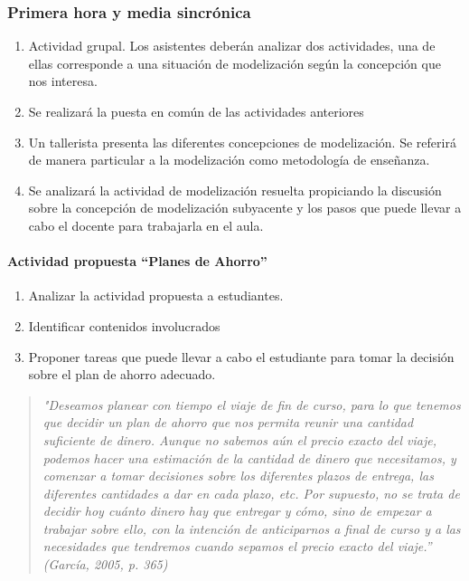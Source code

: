 \subsubsection{Primera hora y media sincrónica}

\begin{enumerate}
	\item Actividad grupal. Los asistentes deberán analizar dos actividades, una de ellas corresponde a una situación de modelización según la concepción que nos interesa.
	\item Se realizará la puesta en común de las actividades anteriores
	\item Un tallerista presenta las diferentes concepciones de modelización. Se referirá de manera particular a la modelización como metodología de enseñanza.
	\item Se analizará la actividad de modelización resuelta propiciando la discusión sobre la concepción de modelización subyacente y los pasos que puede llevar a cabo el docente para trabajarla en el aula.
\end{enumerate}

\begin{center}
	\begin{minipage}{0.7\linewidth}
		\paragraph*{Actividad propuesta “Planes de Ahorro”}
		
		\begin{enumerate}[{Consigna} 1:]
			\item Analizar la actividad propuesta a estudiantes.
			\item Identificar contenidos involucrados
			\item Proponer tareas que puede llevar a cabo el estudiante para tomar la decisión sobre el plan de ahorro adecuado.
		\end{enumerate}
	\end{minipage}
\end{center}

\bigskip

\begin{quote}
	\itshape
	"Deseamos planear con tiempo el viaje de fin de curso, para lo que tenemos que decidir un plan de ahorro que nos permita reunir una cantidad suficiente de dinero. Aunque no sabemos aún el precio exacto del viaje, podemos hacer una estimación de la cantidad de dinero que necesitamos, y comenzar a tomar decisiones sobre los diferentes plazos de entrega, las diferentes cantidades a dar en cada plazo, etc. Por supuesto, no se trata de decidir hoy cuánto dinero hay que entregar y cómo, sino de empezar a trabajar sobre ello, con la intención de anticiparnos a final de curso y a las necesidades que tendremos cuando sepamos el precio exacto del viaje.” (García, 2005, p. 365)
\end{quote}

